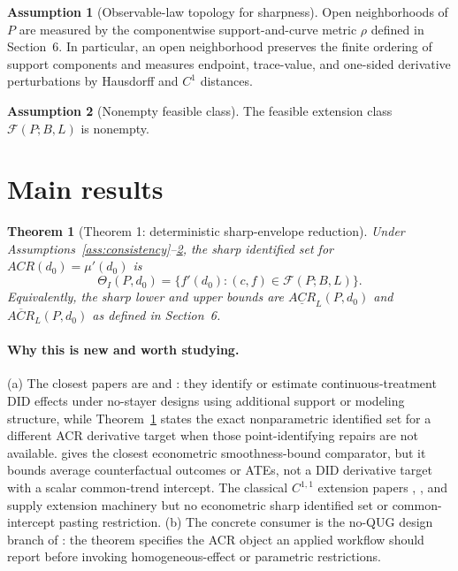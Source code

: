 \documentclass[11pt]{article}
\theoremstyle{definition}
\newtheorem{assumption}{Assumption}
\theoremstyle{plain}
\newtheorem{theorem}{Theorem}
\theoremstyle{remark}
\begin{document}
\begin{assumption}[Observable-law topology for sharpness]\label{ass:topology}
Open neighborhoods of \(P\) are measured by the componentwise support-and-curve metric \(\rho\) defined in Section~6.  In particular, an open neighborhood preserves the finite ordering of support components and measures endpoint, trace-value, and one-sided derivative perturbations by Hausdorff and \(C^1\) distances.
\end{assumption}

\begin{assumption}[Nonempty feasible class]\label{ass:nonempty}
The feasible extension class \(\mathcal{F}(P;B,L)\) is nonempty.
\end{assumption}

\section{Main results}
\begin{theorem}[Theorem 1: deterministic sharp-envelope reduction]\label{thm:deterministic-envelope}
Under Assumptions~\ref{ass:consistency}--\ref{ass:nonempty}, the sharp identified set for \(ACR(d_0)=\mu'(d_0)\) is
\[
  \Theta_I(P,d_0)=\{f'(d_0):(c,f)\in\mathcal{F}(P;B,L)\}.
\]
Equivalently, the sharp lower and upper bounds are \(\underline{ACR}_L(P,d_0)\) and \(\overline{ACR}_L(P,d_0)\) as defined in Section~6.
\end{theorem}
\paragraph{Why this is new and worth studying.}
(a) The closest papers are \citet{DCDHVB2024NoStayers} and \citet{DCDHK2026NoUntreated}: they identify or estimate continuous-treatment DID effects under no-stayer designs using additional support or modeling structure, while Theorem~\ref{thm:deterministic-envelope} states the exact nonparametric identified set for a different ACR derivative target when those point-identifying repairs are not available.  \citet{KimKwonKwonLee2018} gives the closest econometric smoothness-bound comparator, but it bounds average counterfactual outcomes or ATEs, not a DID derivative target with a scalar common-trend intercept.  The classical \(C^{1,1}\) extension papers \citet{Wells1973}, \citet{LeGruyer2009}, and \citet{DaniilidisHaddouLeGruyerLey2018} supply extension machinery but no econometric sharp identified set or common-intercept pasting restriction.  (b) The concrete consumer is the no-QUG design branch of \citet{DCDHK2026NoUntreated}: the theorem specifies the ACR object an applied workflow should report before invoking homogeneous-effect or parametric restrictions.
\end{document}
